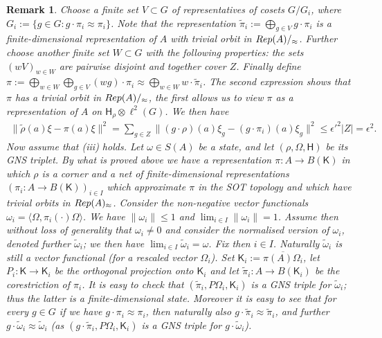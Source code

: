 \documentclass[11 pt, leqno, hidelinks]{amsart}%
\theoremstyle{plain}
\newtheorem{remark}[theorem]{Remark}
\numberwithin{equation}{section}
\newcommand{\Rep}{\textup{Rep}}
\newcommand{\Hil}{\mathsf{H}}
\newcommand{\Kil}{\mathsf{K}}
\begin{document}
\begin{remark}
Choose a finite set $V \subset G$ of representatives of cosets $G/G_i$, where $G_i:= \{g \in G: g \cdot \pi_i \approx \pi_i\}$. Note that the representation $\tilde{\pi}_i:=\bigoplus_{g \in V} g \cdot \pi_i$ is a finite-dimensional representation of $A$ with trivial orbit in $\Rep(A)/_\approx$. Further choose another finite set $W \subset G$ with the following properties: the sets $(wV)_{w \in W}$ are pairwise disjoint and together cover $Z$. Finally define $\pi:= \bigoplus_{w \in W} \bigoplus_{g \in V} (wg)\cdot \pi_i\approx \bigoplus_{w \in W} w \cdot \tilde{\pi}_i$. The second expression shows that $\pi$ has a trivial orbit in  $\Rep(A)/_\approx$, the first allows us to view $\pi$ as a representation of $A$ on $\Hil_\rho \otimes \ell^2(G)$. We then have
\begin{align*} \|\tilde{\rho}(a) \xi - \pi(a)\xi \|^2 = \sum_{g \in Z} \|(g \cdot\rho)(a) \xi_g - (g \cdot\pi_i)(a)\xi_g \|^2 \leq \epsilon'^2 |Z| =\epsilon^2.
\end{align*}
Now assume that (iii) holds. Let $\omega \in S(A)$ be a state, and let $(\rho, \Omega, \Hil)$ be its GNS triplet. By what is proved above we have a representation $\pi:A \to B(\Kil)$ in which $\rho$ is a corner and a net of finite-dimensional representations $(\pi_i:A \to B(\Kil))_{i \in I}$ which approximate $\pi$ in the SOT topology and which have trivial orbits in $\Rep(A)_\approx$. Consider the non-negative vector functionals $\omega_i = \langle \Omega, \pi_i(\cdot) \Omega \rangle$. We have $\|\omega_i\| \leq 1$ and $\lim_{i \in I} \|\omega_i\|=1$. Assume then without loss of generality that $\omega_i \neq 0$ and consider the normalised version of $\omega_i$, denoted further $\tilde{\omega}_i$; we then have $\lim_{i \in I}\tilde{\omega}_i = \omega$. Fix then $i \in I$. Naturally $\tilde{\omega}_i$ is still a vector functional (for a rescaled vector $\Omega_i$). Set $\Kil_i:= \overline{\pi(A) \Omega_i}$, let $P_i:\Kil \to \Kil_i$ be the orthogonal projection onto $\Kil_i$ and let $\tilde{\pi}_i:A \to B(\Kil_i)$ be the corestriction of $\pi_i$.  It is easy to check that $(\tilde{\pi}_i, P \Omega_i, \Kil_i)$ is a GNS triple for $\tilde{\omega}_i$; thus the latter is a finite-dimensional state. Moreover it is easy to see that for every $g \in G$ if we have $g \cdot \pi_i \approx \pi_i$, then naturally also $g \cdot \tilde{\pi}_i \approx \tilde{\pi}_i$, and further $g \cdot \tilde{\omega}_i \approx \tilde{\omega}_i$ (as $(g \cdot\tilde{\pi}_i, P \Omega_i, \Kil_i)$  is a GNS triple for $ g \cdot\tilde{\omega}_i$).
\end{remark}	
\end{document}
